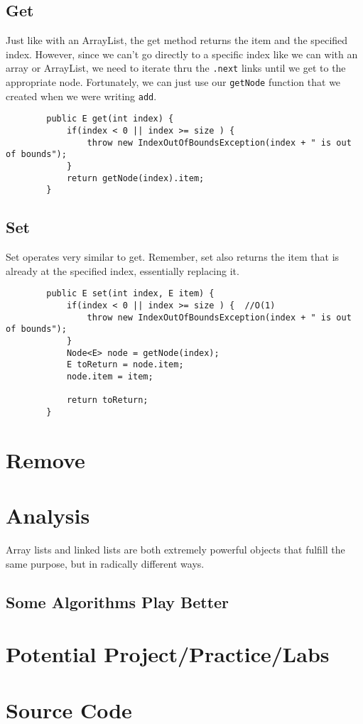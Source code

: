 	\subsection{Get}
	Just like with an ArrayList, the get method returns the item and the specified index.  
	However, since we can't go directly to a specific index like we can with an array or ArrayList, we need to iterate thru the \texttt{.next} links until we get to the appropriate node.
	Fortunately, we can just use our \texttt{getNode} function that we created when we were writing \texttt{add}.
	
	
	
	\begin{verbatim}
		public E get(int index) {
			if(index < 0 || index >= size ) { 
				throw new IndexOutOfBoundsException(index + " is out of bounds");
			}
			return getNode(index).item;
		}
	\end{verbatim}
	
	
	\subsection{Set}
	
	Set operates very similar to get.  Remember, set also returns the item that is already at the specified index, essentially replacing it.
	
	\begin{verbatim}
		public E set(int index, E item) {
			if(index < 0 || index >= size ) {  //O(1)
				throw new IndexOutOfBoundsException(index + " is out of bounds");
			}
			Node<E> node = getNode(index);
			E toReturn = node.item;
			node.item = item;
			
			return toReturn;
		}
	\end{verbatim}
	
	
	\section{Remove}
	
	
	
	
	\section{Analysis}
	Array lists and linked lists are both extremely powerful objects that fulfill  the same purpose, but in radically different ways. 
	
	
	
	
	\subsection{Some Algorithms Play Better}
	
	\section{Potential Project/Practice/Labs}
	
	\section{Source Code}
	\inputminted{python3}{code/linkedlist.py}
